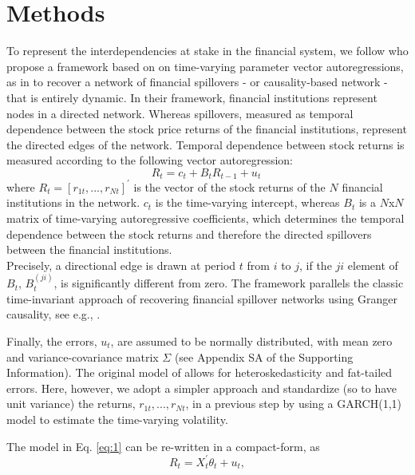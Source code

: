 \documentclass[a4paper,10pt]{article}
\begin{document}
\section{Methods}
To represent the interdependencies at stake in the financial system, we follow \cite{Geraci} who propose a 
framework based on on time-varying parameter vector autoregressions, as in \cite{Primiceri,Cogley} to recover a network of 
financial spillovers  - or causality-based network - that is entirely dynamic. In their framework, financial institutions 
represent nodes in a directed network. Whereas spillovers, measured as temporal dependence between the stock price returns of 
the financial institutions, represent the directed edges of the network.
Temporal dependence between stock returns is measured according to the following vector autoregression:
\begin{equation}
R_t =c_t +B_t R_{t-1} +u_t \ 
\label{eq:1}
 \end{equation} 
\noindent where $R_t = [r_{1t} ,...,r_{Nt}]^{'}$  is the vector of the stock returns of the $N$ financial institutions in the network. 
$c_t$ is the time-varying intercept, whereas $B_t$ is a $N$x$N$ matrix of time-varying autoregressive coefficients, which determines
the temporal dependence between the stock returns and therefore the directed spillovers between the financial institutions. 
\\

Precisely, a directional edge is drawn at period $t$ from $i$ to $j$, if the  $ji$ element of $B_t$,  $B^{(j i)}_t$, is 
significantly different from zero. The framework parallels the classic time-invariant approach of recovering financial 
spillover networks using Granger causality, see e.g., \cite{Billio}. 

Finally, the errors, $u_t$, are assumed to be normally distributed, with mean zero and variance-covariance matrix $\Sigma$
(see Appendix SA of the Supporting Information). The original model of  \cite{Geraci} allows for heteroskedasticity and 
fat-tailed errors. Here, however, we adopt a simpler approach and standardize (so to have unit variance) the returns, 
$r_{1t} ,...,r_{Nt}$, in a previous step by using a GARCH(1,1) model to estimate the time-varying volatility.

The model in Eq. \ref{eq:1} can be re-written in a compact-form, as
\begin{equation}
R_t = X_t^{'}\theta_t +u_t,
\label{eq:2}
 \end{equation} 
\end{document}
